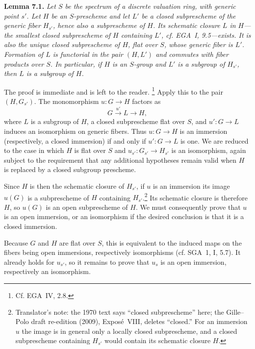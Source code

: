 \medskip
\noindent{}\textbf{Lemma 7.1.}
\textit{Let \(S\) be the spectrum of a discrete valuation ring, with generic
point \(s'\). Let \(H\) be an \(S\)-prescheme and let \(L'\) be a closed
subprescheme of the generic fiber \(H_{s'}\), hence also a subprescheme of
\(H\). Its schematic closure \(L\) in \(H\)---the smallest closed
subprescheme of \(H\) containing \(L'\), cf. EGA~I, 9.5---exists. It is
also the unique closed subprescheme of \(H\), flat over \(S\), whose generic
fiber is \(L'\). Formation of \(L\) is functorial in the pair \((H,L')\)
and commutes with fiber products over \(S\). In particular, if \(H\) is an
\(S\)-group and \(L'\) is a subgroup of \(H_{s'}\), then \(L\) is a
subgroup of \(H\).}

The proof is immediate and is left to the reader.\begingroup
\renewcommand{\thefootnote}{(\(\ast\ast\))}%
\footnote[0]{Cf. EGA~IV, 2.8.}%
\endgroup
Apply this to the pair \((H,G_{s'})\). The monomorphism \(u:G\to H\)
factors as
\[
  G\xrightarrow{\,u'\,}L\longrightarrow H,
\]
where \(L\) is a subgroup of \(H\), a closed subprescheme flat over \(S\),
and \(u':G\to L\) induces an isomorphism on generic fibers. Thus \(u:G\to H\)
is an immersion (respectively, a closed immersion) if and only if
\(u':G\to L\) is one. We are reduced to the case in which \(H\) is flat over
\(S\) and \(u_{s'}:G_{s'}\to H_{s'}\) is an isomorphism, again subject
to the requirement that any additional hypotheses remain valid when \(H\)
is replaced by a closed subgroup prescheme.

Since \(H\) is then the schematic closure of \(H_{s'}\), if \(u\) is an
immersion its image \(u(G)\) is a subprescheme of \(H\) containing
\(H_{s'}\).\footnote{Translator's note: the 1970 text says ``closed subprescheme'' here; the
Gille--Polo draft re-edition (2009), Expos\'e~VIII, deletes ``closed.'' For an immersion \(u\) the
image is in general only a locally closed subprescheme, and a closed subprescheme containing
\(H_{s'}\) would contain its schematic closure \(H\).} Its
schematic closure is therefore \(H\), so \(u(G)\) is an open subprescheme of
\(H\). We must consequently prove that \(u\) is an open immersion, or an
isomorphism if the desired conclusion is that it is a closed immersion.

Because \(G\) and \(H\) are flat over \(S\), this is equivalent to the
induced maps on the fibers being open immersions, respectively
isomorphisms (cf. SGA~1, I, 5.7). It already holds for \(u_{s'}\), so it
remains to prove that \(u_s\) is an open immersion, respectively an
isomorphism.

